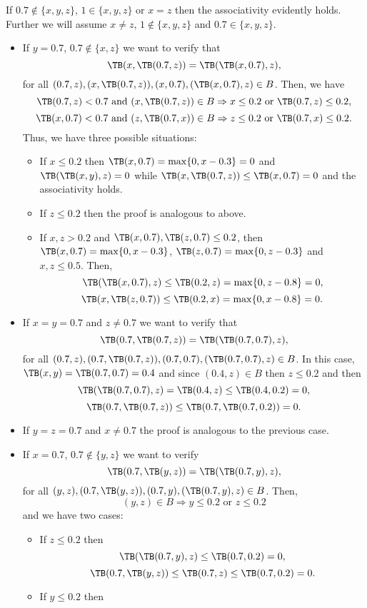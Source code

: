 \begin{example}
	If $0.7 \not \in \{x,y,z\}$, $1 \in \{x,y,z\}$ or $x=z$ then the associativity evidently holds. Further we will assume $x \not = z$, $1 \not \in \{x,y,z\}$ and $0.7 \in \{x,y,z\}$.
	\begin{itemize}
		\item If $y=0.7$, $0.7 \not \in \{x,z\}$ we want to verify that
		$$\TB(x,\TB(0.7,z))=\TB(\TB(x,0.7),z),$$
		for all $(0.7,z), (x,\TB(0.7,z)), (x,0.7), (\TB(x,0.7),z)\in B$. Then, we have
		$$\TB(0.7,z) < 0.7 \text{ and } (x,\TB(0.7,z)) \in B \Rightarrow x \leq 0.2 \text{ or } \TB(0.7,z) \leq 0.2,$$
		$$\TB(x,0.7) < 0.7 \text{ and } (z,\TB(0.7,x)) \in B \Rightarrow z \leq 0.2 \text{ or } \TB(0.7,x) \leq 0.2.$$
		Thus, we have three possible situations:
		\begin{itemize}
			\item If $x\leq 0.2$ then $\TB(x,0.7) = \max\{0,x-0.3\}=0$ and $\TB(\TB(x,y),z)=0$ while $\TB(x,\TB(0.7,z)) \leq \TB(x,0.7)=0$ and the associativity holds.
			\item If $z \leq 0.2$ then the proof is analogous to above.
			\item If $x,z>0.2$ and $\TB(x,0.7),\TB(z,0.7) \leq 0.2$, then $\TB(x,0.7) = \max\{0,x-0.3\}$, $\TB(z,0.7) = \max\{0,z-0.3\}$ and $x,z \leq 0.5$. Then,
			$$\TB(\TB(x,0.7),z) \leq \TB(0.2,z) = \max \{0,z-0.8\} =0,$$
			$$\TB(x,\TB(z,0.7)) \leq \TB(0.2,x) = \max \{0,x-0.8\}=0.$$
		\end{itemize}
		\item If $x=y=0.7$ and $z \not = 0.7$ we want to verify that
		$$\TB(0.7,\TB(0.7,z))=\TB(\TB(0.7,0.7),z),$$
		for all $(0.7,z), (0.7,\TB(0.7,z)), (0.7,0.7), (\TB(0.7,0.7),z)\in B$. In this case, $\TB(x,y)= \TB(0.7,0.7)=0.4$ and since $(0.4,z) \in B$ then $z \leq 0.2$ and then
		$$\TB(\TB(0.7,0.7),z)=\TB(0.4,z) \leq \TB(0.4,0.2)=0,$$
		$$\TB(0.7,\TB(0.7,z)) \leq \TB(0.7,\TB(0.7,0.2))=0.$$
		\item If $y=z=0.7$ and $x \not = 0.7$ the proof is analogous to the previous case.
		\item If $x=0.7$, $0.7 \not \in \{y,z\}$ we want to verify
		$$\TB(0.7,\TB(y,z))=\TB(\TB(0.7,y),z),$$
		for all $(y,z), (0.7,\TB(y,z)), (0.7,y), (\TB(0.7,y),z)\in B$. Then,
		$$ (y,z) \in B \Rightarrow y \leq 0.2 \text{ or } z \leq 0.2$$
		and we have two cases:
		\begin{itemize}
			\item If $z \leq 0.2$ then
			$$\TB(\TB(0.7,y),z) \leq \TB(0.7,0.2)=0,$$
			$$\TB(0.7,\TB(y,z)) \leq \TB(0.7,z) \leq \TB(0.7,0.2)=0.$$
			\item If $y \leq 0.2$ then

\end{itemize}
\end{itemize}
\end{example}
